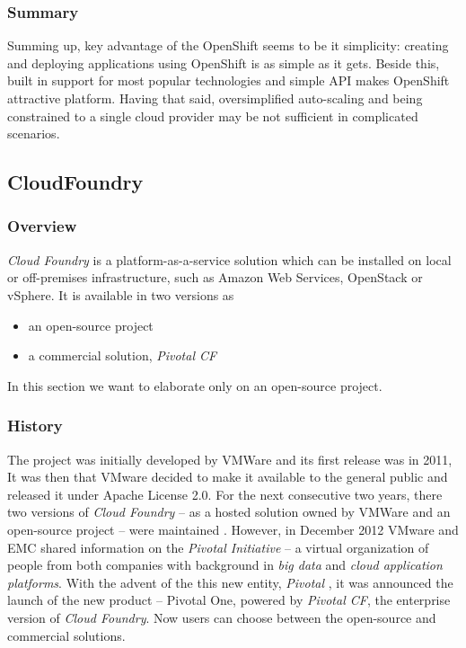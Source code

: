 \subsubsection{Summary}
Summing up, key advantage of the OpenShift seems to be it simplicity: creating and deploying applications using OpenShift is as simple as it gets. Beside this, built in support for most popular technologies and simple API makes OpenShift attractive platform. Having that said, oversimplified auto-scaling and being constrained to a single cloud provider may be not sufficient in complicated scenarios.

\subsection{CloudFoundry}
\subsubsection{Overview}
\emph{Cloud Foundry} is a platform-as-a-service solution which can be installed on local or off-premises infrastructure, such as Amazon Web Services, OpenStack or vSphere. It is available in two versions as
\begin{itemize}
  \item an open-source project
  \item a commercial solution, \emph{Pivotal CF}
\end{itemize}
In this section we want to elaborate only on an open-source project.

\subsubsection{History}
The project was initially developed by VMWare and its first release was in 2011, It was then that VMware decided to make it available to the general public and released it under Apache License 2.0. For the next consecutive two years, there two versions of \emph{Cloud Foundry} -- as a hosted solution owned by VMWare and an open-source project -- were maintained . However, in December 2012 VMware and EMC shared information on the \emph{Pivotal Initiative} \cite{PivotalInitiative} -- a virtual organization of people from both companies with background in \emph{big data} and \emph{cloud application platforms}. With the advent of the this new entity, \emph{Pivotal} \cite{GoPivotal}, it was announced the launch of the new product -- Pivotal One, powered by \emph{Pivotal CF}, the enterprise version of \emph{Cloud Foundry}. Now users can choose between the open-source and commercial solutions.

